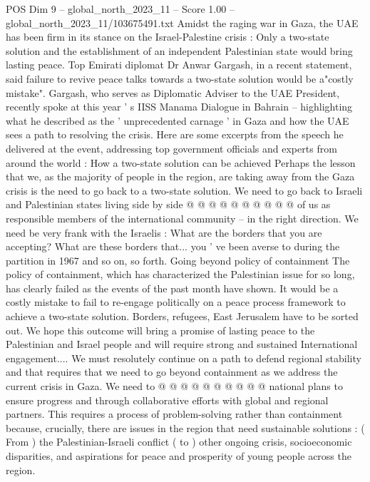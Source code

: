 \begin{textsample}{POS Dim 9 – global\_north\_2023\_11 – Score 1.00 – global\_north\_2023\_11/103675491.txt}  \label{ex:f9_pos_384}
Amidst the raging war in Gaza, the UAE has been firm in its stance on the Israel-Palestine crisis : Only a two-state solution and the establishment of an independent Palestinian state would bring lasting peace.
Top Emirati diplomat Dr Anwar Gargash, in a recent statement, said failure to revive peace talks towards a two-state solution would be a"costly mistake".
Gargash, who serves as Diplomatic Adviser to the UAE President, recently spoke at this year ' s IISS Manama Dialogue in Bahrain -- highlighting what he described as the ' unprecedented carnage ' in Gaza and how the UAE sees a path to resolving the crisis.
Here are some excerpts from the speech he delivered at the event, addressing top government officials and experts from around the world : How a two-state solution can be achieved Perhaps the lesson that we, as the majority of people in the region, are taking away from the Gaza crisis is the need to go back to a two-state solution.
We need to go back to Israeli and Palestinian states living side by side @ @ @ @ @ @ @ @ @ @ of us as responsible members of the international community -- in the right direction.
We need be very frank with the Israelis : What are the borders that you are accepting?
What are these borders that... you ' ve been averse to during the partition in 1967 and so on, so forth.
Going beyond policy of containment The policy of containment, which has characterized the Palestinian issue for so long, has clearly failed as the events of the past month have shown.
It would be a costly mistake to fail to re-engage politically on a peace process framework to achieve a two-state solution.
Borders, refugees, East Jerusalem have to be sorted out.
We hope this outcome will bring a promise of lasting peace to the Palestinian and Israel people and will require strong and sustained International engagement....
We must resolutely continue on a path to defend regional stability and that requires that we need to go beyond containment as we address the current crisis in Gaza.
We need to @ @ @ @ @ @ @ @ @ @ national plans to ensure progress and through collaborative efforts with global and regional partners.
This requires a process of problem-solving rather than containment because, crucially, there are issues in the region that need sustainable solutions : ( From ) the Palestinian-Israeli conflict ( to ) other ongoing crisis, socioeconomic disparities, and aspirations for peace and prosperity of young people across the region.

\end{textsample}
